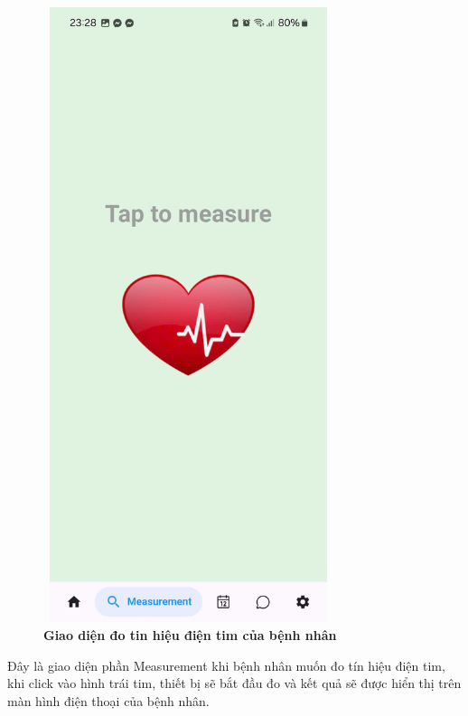 \begin{figure}[H]
		\centering
		\includegraphics[width=8.5cm,height=18cm]{Images/AppUI/measure.jpg}
		\caption[Giao diện đo tín hiệu điện tim của bệnh nhân]{\bfseries \fontsize{12pt}{0pt}\selectfont Giao diện đo tin hiệu điện tim của bệnh nhân}
		\label{measurement}
\end{figure}
	Đây là giao diện phần Measurement khi bệnh nhân muốn đo tín hiệu điện tim, khi click vào hình trái tim, thiết bị sẽ bắt đầu đo và kết quả sẽ được hiển thị trên màn hình điện thoại của bệnh nhân.

